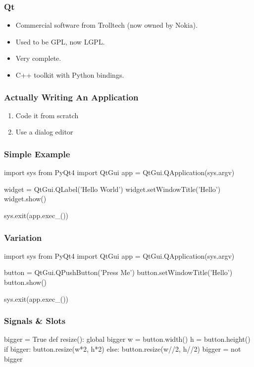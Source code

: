 \begin{frame}[fragile]
\frametitle{Qt}
\begin{itemize}
\item Commercial software from Trolltech (now owned by Nokia).
\item Used to be GPL, now LGPL.
\item Very complete.
\item C++ toolkit with Python bindings.
\end{itemize}
\end{frame}

\begin{frame}[fragile]
\frametitle{Actually Writing An Application}
\begin{enumerate}
\item Code it from scratch
\item Use a dialog editor
\end{enumerate}
\end{frame}

\begin{frame}[fragile]
\frametitle{Simple Example}

\begin{python}
import sys
from PyQt4 import QtGui
app = QtGui.QApplication(sys.argv)

widget = QtGui.QLabel('Hello World')
widget.setWindowTitle('Hello')
widget.show()

sys.exit(app.exec_())

\end{python}

\end{frame}

\begin{frame}[fragile]
\frametitle{Variation}


\begin{python}
import sys
from PyQt4 import QtGui
app = QtGui.QApplication(sys.argv)

button = QtGui.QPushButton('Press Me')
button.setWindowTitle('Hello')
button.show()

sys.exit(app.exec_())

\end{python}

\end{frame}

\begin{frame}[fragile]
\frametitle{Signals \& Slots}

\begin{python}
bigger = True
def resize():
    global bigger
    w = button.width()
    h = button.height()
    if bigger:
        button.resize(w*2, h*2)
    else:
        button.resize(w//2, h//2)
    bigger = not bigger

\end{python}
\end{frame}

